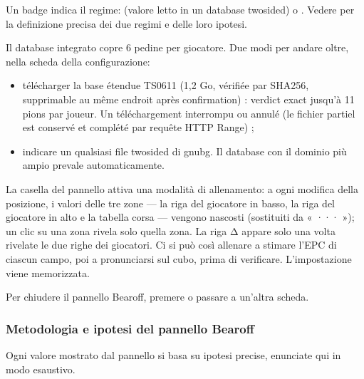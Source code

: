 \documentclass[letterpaper,10pt,italian]{sphinxmanual}
\begin{document}
\sphinxAtStartPar
Un badge indica il regime:  (valore letto in un database two\sphinxhyphen{}sided) o . Vedere {\hyperref[\detokenize{manuel:epc-methodologie}]{}} per la definizione precisa dei due regimi e delle loro ipotesi.

\sphinxAtStartPar
{} Il database integrato copre 6 pedine per giocatore. Due modi per andare oltre, nella scheda  della configurazione:
\begin{itemize}
\item {} 
\sphinxAtStartPar
télécharger la base étendue TS\sphinxhyphen{}06\sphinxhyphen{}11 (1,2 Go, vérifiée par SHA\sphinxhyphen{}256,
supprimable au même endroit après confirmation) : verdict exact jusqu’à
11 pions par joueur. Un téléchargement interrompu ou annulé  (le fichier partiel est conservé et complété par
requête HTTP Range) ;

\item {} 
\sphinxAtStartPar
indicare un qualsiasi file  two\sphinxhyphen{}sided di gnubg. Il database con il dominio più ampio prevale automaticamente.

\end{itemize}

\sphinxAtStartPar
{} La casella  del pannello attiva una modalità di allenamento: a ogni modifica della posizione, i valori delle tre zone — la riga del giocatore in basso, la riga del giocatore in alto e la tabella corsa — vengono nascosti (sostituiti da « ··· »); un clic su una zona rivela solo quella zona. La riga Δ appare solo una volta rivelate le due righe dei giocatori. Ci si può così allenare a stimare l’EPC di ciascun campo, poi a pronunciarsi sul cubo, prima di verificare. L’impostazione viene memorizzata.

\sphinxAtStartPar
Per chiudere il pannello Bearoff, premere  o passare a un’altra scheda.


\subsubsection{Metodologia e ipotesi del pannello Bearoff}
\label{\detokenize{manuel:methodologie-et-hypotheses-du-panneau-bearoff}}\label{\detokenize{manuel:epc-methodologie}}
\sphinxAtStartPar
Ogni valore mostrato dal pannello si basa su ipotesi precise, enunciate qui in modo esaustivo.
\end{document}
